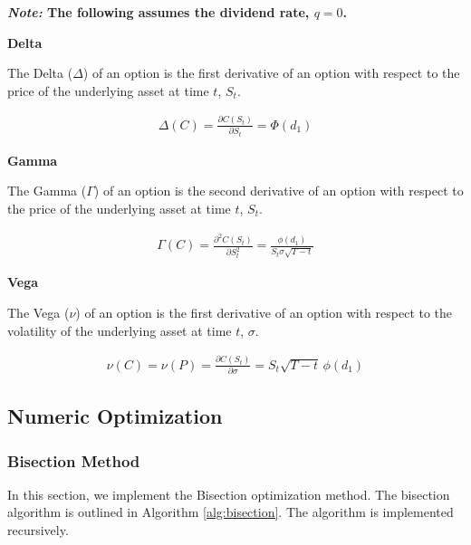 \documentclass[10pt]{article}
\begin{document}
        \begin{center}
            \textbf{\textit{Note:} The following assumes the dividend rate, $q = 0$.}
        \end{center}
    
        \textbf{Delta}
    
        The Delta ($\Delta$) of an option is the first derivative of an option with respect to the price of the underlying asset at time $t$, $S_t$.
    
        \begin{gather*}
            \Delta(C) = \frac{\partial C(S_t)}{\partial S_t} = \Phi(d_1)
        \end{gather*}
    
        \textbf{Gamma}
    
        The Gamma ($\Gamma$) of an option is the second derivative of an option with respect to the price of the underlying asset at time $t$, $S_t$.
    
        \begin{gather*}
            \Gamma(C) = \frac{\partial^2 C(S_t)}{\partial S_t^2} = \frac{\phi(d_1)}{S_t \sigma \sqrt{T-t}}
        \end{gather*}
    
        \textbf{Vega}
    
        The Vega ($\nu$) of an option is the first derivative of an option with respect to the volatility of the underlying asset at time $t$, $\sigma$.
        
        \begin{gather*}
            \nu(C) = \nu(P) = \frac{\partial C(S_t)}{\partial \sigma} = S_t \sqrt{T-t} \, \phi(d_1)
        \end{gather*}
        
        

    \newpage
    \subsection{Numeric Optimization}

        \subsubsection{Bisection Method}

        In this section, we implement the Bisection optimization method. The bisection algorithm is outlined in Algorithm \ref{alg:bisection}. The algorithm is implemented recursively.
\end{document}
